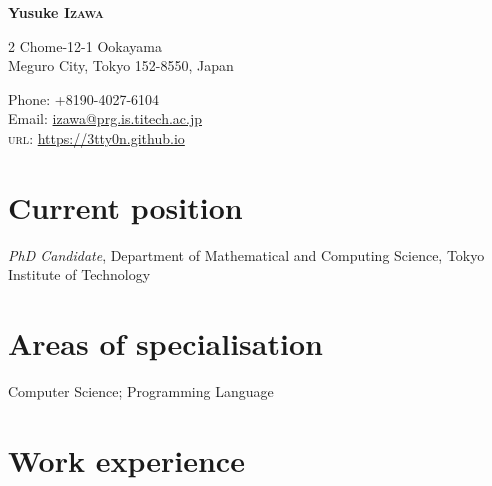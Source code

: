 \documentclass[11pt]{article} %
\newcommand{\伊澤侑祐}{\underline{伊澤侑祐}}
\begin{document}

{\LARGE\bfseries Yusuke \textsc{Izawa}} %
\bigskip\bigskip\medskip %

2 Chome-12-1 Ookayama\\
Meguro City, Tokyo 152-8550, Japan\\ %

\medskip

Phone: +8190-4027-6104\\ %
Email: \href{mailto:izawa@prg.is.titech.ac.jp}{izawa@prg.is.titech.ac.jp}\\ %
\textsc{url}: \href{https://3tty0n.github.io}{https://3tty0n.github.io} \\ %


\section*{Current position}

\emph{PhD Candidate}, Department of Mathematical and Computing Science,
Tokyo Institute of Technology %


\section*{Areas of specialisation}

Computer Science; Programming Language %


\section*{Work experience}


\end{document}

